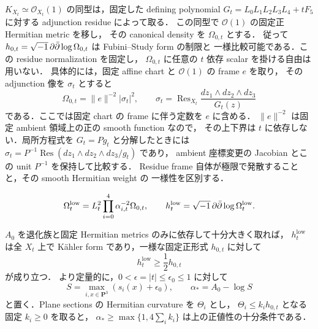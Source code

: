 \documentclass[a4paper,11pt]{ltjsarticle}
\numberwithin{equation}{section}
\theoremstyle{plain}
\theoremstyle{definition}
\theoremstyle{remark}
\newcommand{\PP}{\mathbf P}\newcommand{\CC}{\mathbf C}\newcommand{\RR}{\mathbf R}\newcommand{\ZZ}{\mathbf Z}\newcommand{\NN}{\mathbf N}
\begin{document}
$K_{X_t}\simeq\mathcal O_{X_t}(1)$ の同型は，固定した defining polynomial
$G_t=L_0L_1L_2L_3L_4+tF_5$ に対する adjunction residue によって取る．
この同型で $\mathcal O(1)$ の固定正 Hermitian metric を移し，
その canonical density を $\Omega_{0,t}$ とする．
従って $h_{0,t}=\sqrt{-1}\,\partial\bar\partial\log\Omega_{0,t}$ は Fubini--Study form の制限と
一様比較可能である．この residue normalization を固定し，
$\Omega_{0,t}$ に任意の $t$ 依存 scalar を掛ける自由は用いない．
具体的には，固定 affine chart と $\mathcal O(1)$ の frame $e$ を取り，
その adjunction 像を $\sigma_t$ とすると
\begin{equation}\label{coarse:eq:residue-density-normalization}
 \Omega_{0,t}=\|e\|^{-2}|\sigma_t|^2,
 \qquad
 \sigma_t=\operatorname{Res}_{X_t}
       \frac{dz_1\wedge dz_2\wedge dz_3}{G_t(z)}
\end{equation}
である．ここでは固定 chart の frame に伴う定数を $e$ に含める．
$\|e\|^{-2}$ は固定 ambient 領域上の正の smooth function なので，
その上下界は $t$ に依存しない．局所方程式を $G_t=P g_t$ と分解したときには
$\sigma_t=P^{-1}\operatorname{Res}(dz_1\wedge dz_2\wedge dz_3/g_t)$ であり，
ambient 座標変更の Jacobian とこの unit $P^{-1}$ を保持して比較する．
Residue frame 自体が極限で発散することと，その smooth Hermitian weight の
一様性を区別する．
\begin{definition}\label{coarse:def:Omega-low}
\begin{equation}\label{coarse:eq:Omega-low}
 \Omega_t^{\mathrm{low}}
 =L_t^2\prod_{i=0}^4\alpha_{i,t}^{-2}\Omega_{0,t},
 \qquad h_t^{\mathrm{low}}=\sqrt{-1}\,\partial\bar\partial\log\Omega_t^{\mathrm{low}}.
\end{equation}
\end{definition}

\begin{lemma}\label{coarse:lem:capped-positivity}
$A_0$ を退化族と固定 Hermitian metrics のみに依存して十分大きく取れば，
$h_t^{\mathrm{low}}$ は全 $X_t$ 上で K\"ahler form であり，一様な固定正形式 $h_{0,t}$ に対して
\begin{equation}\label{coarse:eq:capped-positivity}
 h_t^{\mathrm{low}}\ge \frac12 h_{0,t}
\end{equation}
が成り立つ．
より定量的に，$0<\epsilon=|t|\le\epsilon_0\le1$ に対して
\[
 S=\max_{i,x\in\PP^3}(s_i(x)+\epsilon_0),\qquad
 \alpha_*=A_0-\log S
\]
と置く．Plane sections の Hermitian curvature を $\Theta_i$ とし，
$\Theta_i\le k_i h_{0,t}$ となる固定 $k_i\ge0$ を取ると，
$\alpha_*\ge\max\{1,4\sum_i k_i\}$ は上の正値性の十分条件である．
\end{lemma}
\end{document}
